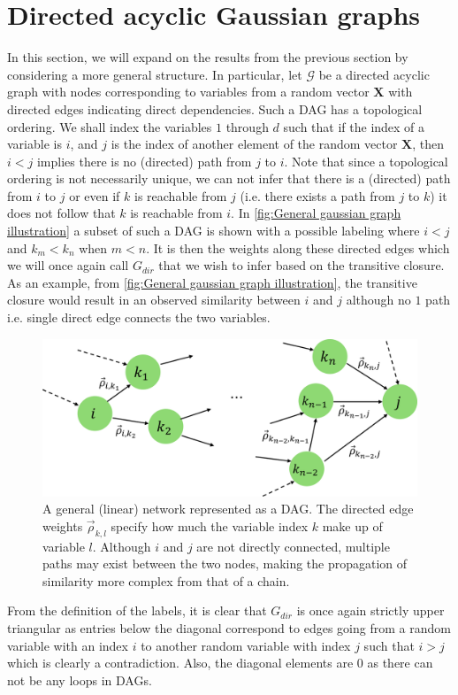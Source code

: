 \documentclass[../Thesis.tex]{subfiles}
\begin{document}
\section{Directed acyclic Gaussian graphs}\label{sec:General Gaussian graph}
In this section, we will expand on the results from the previous section by considering a more general structure. In particular, let $\mathcal{G}$ be a directed acyclic graph with nodes corresponding to variables from a random vector $\boldsymbol X$ with directed edges indicating direct dependencies. Such a DAG has a topological ordering. We shall index the variables $1$ through $d$ such that if the index of a variable is $i$, and $j$ is the index of another element of the random vector $\boldsymbol X$, then $i < j$ implies there is no (directed) path from $j$ to $i$. Note that since a topological ordering is not necessarily unique, we can not infer that there is a (directed) path from $i$ to $j$ or even if $k$ is reachable from $j$ (i.e. there exists a path from $j$ to $k$) it does not follow that $k$ is reachable from $i$. In \autoref{fig:General gaussian graph illustration} a subset of such a DAG is shown with a possible labeling where $i < j$ and $k_m < k_n$ when $m < n$. It is then the weights along these directed edges which we will once again call $G_{dir}$ that we wish to infer based on the transitive closure. As an example, from \autoref{fig:General gaussian graph illustration}, the transitive closure would result in an observed similarity between $i$ and $j$ although no $1$ path i.e. single direct edge connects the two variables.
\begin{figure}[H]
    \centering
    \includegraphics[width = .7\linewidth]{figures/ND examples/Gaussian graph illustration.png}
    \caption{A general (linear) network represented as a DAG. The directed edge weights $\vec{\rho}_{k,l}$ specify how much the variable index $k$ make up of variable $l$. Although $i$ and $j$ are not directly connected, multiple paths may exist between the two nodes, making the propagation of similarity more complex from that of a chain.}
    \label{fig:General gaussian graph illustration}
\end{figure}
From the definition of the labels, it is clear that $G_{dir}$ is once again strictly upper triangular as entries below the diagonal correspond to edges going from a random variable with an index $i$ to another random variable with index $j$ such that $i > j$ which is clearly a contradiction. Also, the diagonal elements are $0$ as there can not be any loops in DAGs.
\end{document}
